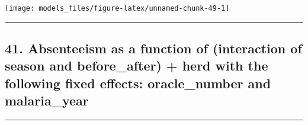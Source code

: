 \documentclass[]{article}
\begin{document}
\begin{center}\texttt{[image: models\_files/figure-latex/unnamed-chunk-49-1]} \end{center}

\newpage

\begin{center}\rule{0.5\linewidth}{\linethickness}\end{center}

\subsection{41. Absenteeism as a function of (interaction of season and
before\_after) + herd with the following fixed effects: oracle\_number
and
malaria\_year}\label{absenteeism-as-a-function-of-interaction-of-season-and-before_after-herd-with-the-following-fixed-effects-oracle_number-and-malaria_year}

\begin{center}\rule{0.5\linewidth}{\linethickness}\end{center}
\end{document}
